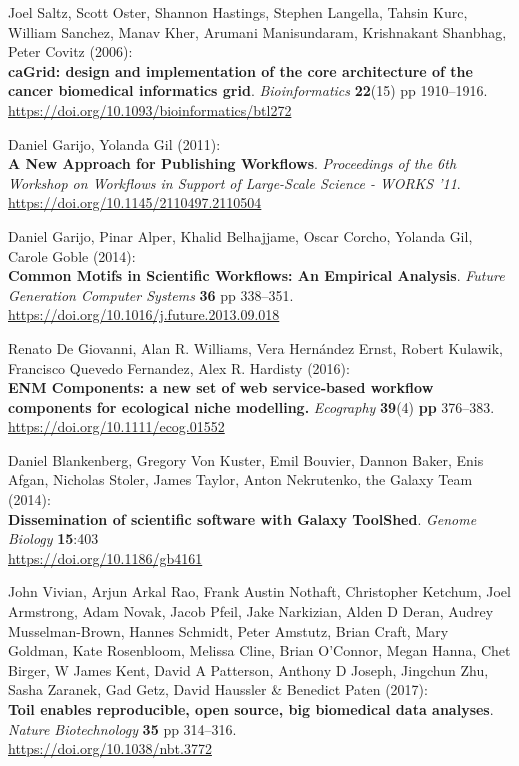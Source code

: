 \begin{thebibliography}{9}
Joel Saltz, Scott Oster, Shannon Hastings, Stephen Langella,
Tahsin Kurc, William Sanchez, Manav Kher, Arumani Manisundaram,
Krishnakant Shanbhag, Peter Covitz (2006):\\
\textbf{caGrid: design and implementation of the core architecture of
the cancer biomedical informatics grid}. \emph{Bioinformatics}
\textbf{22}(15) pp 1910--1916.\\
\url{https://doi.org/10.1093/bioinformatics/btl272}

Daniel Garijo, Yolanda Gil (2011):\\
\textbf{A New Approach for Publishing Workflows}. \emph{Proceedings of
the 6th Workshop on Workflows in Support of Large-Scale Science - WORKS
'11}.\\
\url{https://doi.org/10.1145/2110497.2110504}

Daniel Garijo, Pinar Alper, Khalid Belhajjame, Oscar Corcho,
Yolanda Gil, Carole Goble (2014):\\
\textbf{Common Motifs in Scientific Workflows: An Empirical Analysis}.
\emph{Future Generation Computer Systems} \textbf{36} pp 338--351.\\
\url{https://doi.org/10.1016/j.future.2013.09.018}

Renato De Giovanni, Alan R. Williams, Vera Hernández Ernst,
Robert Kulawik, Francisco Quevedo Fernandez, Alex R. Hardisty (2016):\\
\textbf{ENM Components: a new set of web service‐based workflow
components for ecological niche modelling.} \emph{Ecography}
\textbf{39}(4) \textbf{pp} 376--383.\\
\url{https://doi.org/10.1111/ecog.01552}

Daniel Blankenberg, Gregory Von Kuster, Emil Bouvier, Dannon
Baker, Enis Afgan, Nicholas Stoler, James Taylor, Anton Nekrutenko, the
Galaxy Team (2014):\\
\textbf{Dissemination of scientific software with Galaxy ToolShed}.
\emph{Genome Biology} \textbf{15}:403\\
\url{https://doi.org/10.1186/gb4161}

John Vivian, Arjun Arkal Rao, Frank Austin Nothaft, Christopher
Ketchum, Joel Armstrong, Adam Novak, Jacob Pfeil, Jake Narkizian, Alden
D Deran, Audrey Musselman-Brown, Hannes Schmidt, Peter Amstutz, Brian
Craft, Mary Goldman, Kate Rosenbloom, Melissa Cline, Brian O'Connor,
Megan Hanna, Chet Birger, W James Kent, David A Patterson, Anthony D
Joseph, Jingchun Zhu, Sasha Zaranek, Gad Getz, David Haussler \&
Benedict Paten (2017):\\
\textbf{Toil enables reproducible, open source, big biomedical data
analyses}. \emph{Nature Biotechnology} \textbf{35} pp 314--316.\\
\url{https://doi.org/10.1038/nbt.3772}


\end{thebibliography}
